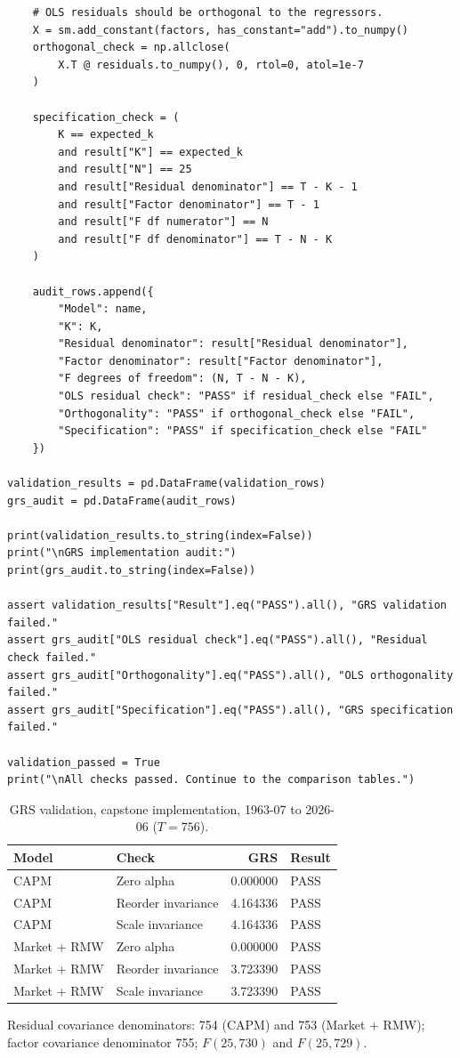 \documentclass[11pt]{article}
\begin{document}
\begin{lstlisting}
    # OLS residuals should be orthogonal to the regressors.
    X = sm.add_constant(factors, has_constant="add").to_numpy()
    orthogonal_check = np.allclose(
        X.T @ residuals.to_numpy(), 0, rtol=0, atol=1e-7
    )

    specification_check = (
        K == expected_k
        and result["K"] == expected_k
        and result["N"] == 25
        and result["Residual denominator"] == T - K - 1
        and result["Factor denominator"] == T - 1
        and result["F df numerator"] == N
        and result["F df denominator"] == T - N - K
    )

    audit_rows.append({
        "Model": name,
        "K": K,
        "Residual denominator": result["Residual denominator"],
        "Factor denominator": result["Factor denominator"],
        "F degrees of freedom": (N, T - N - K),
        "OLS residual check": "PASS" if residual_check else "FAIL",
        "Orthogonality": "PASS" if orthogonal_check else "FAIL",
        "Specification": "PASS" if specification_check else "FAIL"
    })

validation_results = pd.DataFrame(validation_rows)
grs_audit = pd.DataFrame(audit_rows)

print(validation_results.to_string(index=False))
print("\nGRS implementation audit:")
print(grs_audit.to_string(index=False))

assert validation_results["Result"].eq("PASS").all(), "GRS validation failed."
assert grs_audit["OLS residual check"].eq("PASS").all(), "Residual check failed."
assert grs_audit["Orthogonality"].eq("PASS").all(), "OLS orthogonality failed."
assert grs_audit["Specification"].eq("PASS").all(), "GRS specification failed."

validation_passed = True
print("\nAll checks passed. Continue to the comparison tables.")
\end{lstlisting}

\begin{table}[H]
\centering
\caption{GRS validation, capstone implementation, 1963-07 to 2026-06
($T = 756$).}
\small
\begin{tabular}{llrl}
\toprule
Model & Check & GRS & Result \\
\midrule
CAPM & Zero alpha & 0.000000 & PASS \\
CAPM & Reorder invariance & 4.164336 & PASS \\
CAPM & Scale invariance & 4.164336 & PASS \\
Market + RMW & Zero alpha & 0.000000 & PASS \\
Market + RMW & Reorder invariance & 3.723390 & PASS \\
Market + RMW & Scale invariance & 3.723390 & PASS \\
\bottomrule
\end{tabular}
\label{tab:cap_valid}
\vspace{2pt}\begin{minipage}{0.93\textwidth}\footnotesize
Residual covariance denominators: 754 (CAPM) and 753 (Market + RMW); factor
covariance denominator 755; $F(25, 730)$ and $F(25, 729)$.
\end{minipage}
\end{table}
\end{document}
